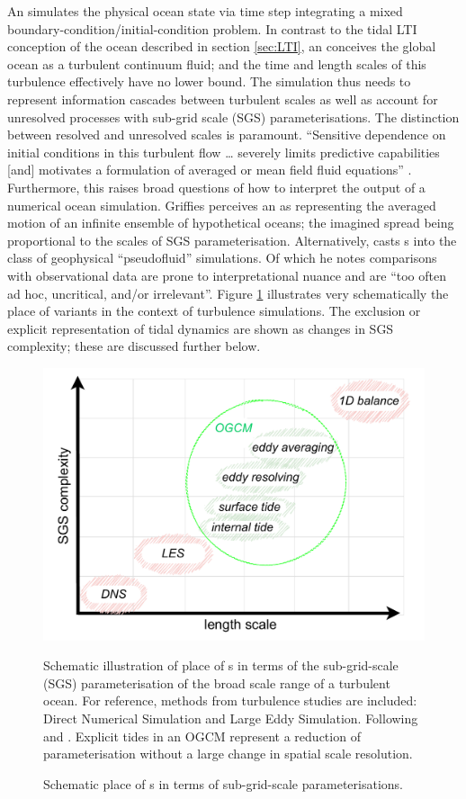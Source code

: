 An \OGCM{} simulates the physical ocean state via time step integrating a mixed boundary-condition/initial-condition problem.
In contrast to the tidal LTI conception of the ocean described in section \ref{sec:LTI}, an \OGCM{} conceives the global ocean as a turbulent continuum fluid; and the time and length scales of this turbulence effectively have no lower bound. The simulation thus needs to represent information cascades between turbulent scales as well as account for unresolved processes with sub-grid scale (SGS) parameterisations.
The distinction between resolved and unresolved scales is paramount.  ``Sensitive dependence on initial conditions in this turbulent flow \dots{} severely limits predictive capabilities [and] motivates a formulation of averaged or mean field fluid equations'' \citep[Sec 2.5]{Griffies:2004vs}.
Furthermore, this raises broad questions of how to interpret the output of a numerical ocean simulation.
Griffies perceives an \OGCM{} as representing the averaged motion of an infinite ensemble of hypothetical oceans; the imagined spread being proportional to the scales of SGS parameterisation.
Alternatively, \citet{Stevens:2001kb} casts \OGCM{}s into the class of geophysical ``pseudofluid'' simulations. Of which he notes comparisons with observational data are prone to interpretational nuance and are ``too often ad hoc, uncritical, and/or irrelevant''\citep[pp 286]{Stevens:2001kb}. 
Figure \ref{fig:ogcmScales} illustrates very schematically the place of \OGCM{} variants in the context of turbulence simulations.   The exclusion or explicit representation of tidal dynamics are shown as changes in SGS complexity; these are discussed further below.
\begin{figure}[h]\centering
  \includegraphics[width=\figwidthBig]{figures/diagrams/ogcm_scales.pdf}
  \caption{Schematic place of \OGCM{}s in terms of sub-grid-scale parameterisations.}
  {Schematic illustration of place of \OGCM{}s in terms of the sub-grid-scale (SGS) parameterisation of the broad scale range of a turbulent ocean.  For reference, methods from turbulence studies are included: Direct Numerical Simulation and Large Eddy Simulation. Following \citep[fig 5.2]{Petersen:2012tr} and \citep{Stevens:2001kb}.  Explicit tides in an OGCM represent a reduction of parameterisation without a large change in spatial scale resolution.}
  \label{fig:ogcmScales}
\end{figure}
